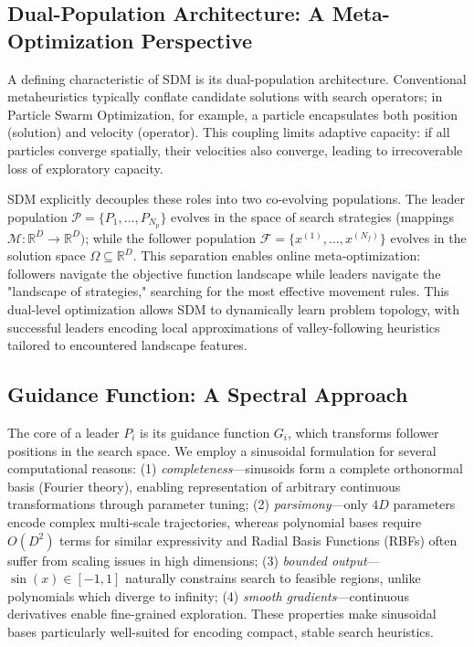 \documentclass[11pt]{article}
\begin{document}
\subsection{Dual-Population Architecture: A Meta-Optimization Perspective}

A defining characteristic of SDM is its dual-population architecture. Conventional metaheuristics typically conflate candidate solutions with search operators; in Particle Swarm Optimization, for example, a particle encapsulates both position (solution) and velocity (operator). This coupling limits adaptive capacity: if all particles converge spatially, their velocities also converge, leading to irrecoverable loss of exploratory capacity.

SDM explicitly decouples these roles into two co-evolving populations. The leader population $\mathcal{P} = \{P_1, \ldots, P_{N_p}\}$ evolves in the space of search strategies (mappings $\mathcal{M}: \mathbb{R}^D \to \mathbb{R}^D)$; while the follower population $\mathcal{F} = \{x^{(1)}, \ldots, x^{(N_f)}\}$ evolves in the solution space $\Omega \subseteq \mathbb{R}^D$. This separation enables online meta-optimization: followers navigate the objective function landscape while leaders navigate the "landscape of strategies," searching for the most effective movement rules. This dual-level optimization allows SDM to dynamically learn problem topology, with successful leaders encoding local approximations of valley-following heuristics tailored to encountered landscape features.

\subsection{Guidance Function: A Spectral Approach}


The core of a leader $P_i$ is its guidance function $G_i$, which transforms follower positions in the search space. We employ a sinusoidal formulation for several computational reasons: (1) \textit{completeness}---sinusoids form a complete orthonormal basis (Fourier theory), enabling representation of arbitrary continuous transformations through parameter tuning; (2) \textit{parsimony}---only $4D$ parameters encode complex multi-scale trajectories, whereas polynomial bases require $O(D^2)$ terms for similar expressivity and Radial Basis Functions (RBFs) often suffer from scaling issues in high dimensions; (3) \textit{bounded output}---$\sin(x) \in [-1, 1]$ naturally constrains search to feasible regions, unlike polynomials which diverge to infinity; (4) \textit{smooth gradients}---continuous derivatives enable fine-grained exploration. These properties make sinusoidal bases particularly well-suited for encoding compact, stable search heuristics.
\end{document}
